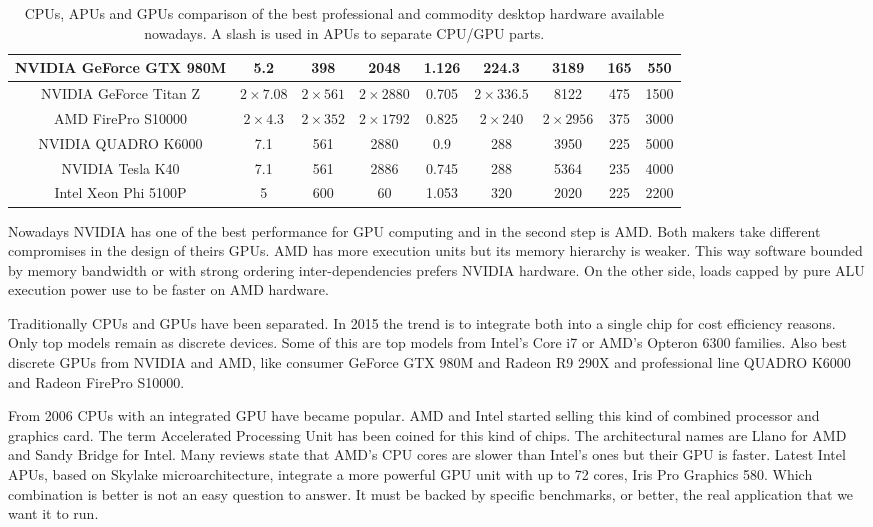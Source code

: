 \documentclass[review]{elsarticle}
\begin{document}
\begin{table*}[!h]
{\begin{tabular}{|c|c|c|c|c|c|c|c|c|}
\hline
NVIDIA GeForce GTX 980M & 5.2           & 398          & 2048          & 1.126      & 224.3        & 3189           & 165 & 550    \\
\hline
NVIDIA GeForce Titan Z  & $2\times7.08$ & $2\times561$ & $2\times2880$ & 0.705      & $2\times336.5$ & 8122         & 475 & 1500   \\
\hline
\hline
AMD FirePro S10000      & $2\times4.3$  & $2\times352$ & $2\times1792$ & 0.825      & $2\times240$ & $2\times2956$  & 375 & 3000   \\
\hline
NVIDIA QUADRO K6000     & 7.1           & 561          & 2880          & 0.9        & 288          & 3950           & 225 & 5000   \\
\hline
\hline
NVIDIA Tesla K40        & 7.1           & 561          & 2886          & 0.745      & 288          & 5364           & 235 & 4000   \\
\hline
Intel Xeon Phi 5100P    & 5             & 600          & 60            & 1.053      & 320          & 2020           & 225 & 2200   \\
\hline

\end{tabular}
}
\caption{CPUs, APUs and GPUs comparison of the best professional and commodity desktop hardware available nowadays. A slash is used in APUs to separate CPU/GPU parts. \label{tab:features}}
\end{table*}

Nowadays NVIDIA has one of the best performance for GPU computing \cite{benchmarkGPU2015} and in the second step is AMD. Both makers take different compromises in the design of theirs GPUs. AMD has more execution units but its memory hierarchy is weaker. This way software bounded by memory bandwidth or with strong ordering inter-dependencies prefers NVIDIA hardware. On the other side, loads capped by pure ALU execution power use to be faster on AMD hardware.

Traditionally CPUs and GPUs have been separated. In 2015 the trend is
to integrate both into a single chip for cost efficiency reasons. Only
top models remain as discrete devices. Some of this are top models
from Intel's Core i7 or AMD's Opteron 6300 families. Also best
discrete GPUs from NVIDIA and AMD, like consumer GeForce GTX 980M and
Radeon R9 290X and professional line QUADRO K6000 and Radeon FirePro
S10000.

From 2006 CPUs with an integrated GPU have became popular. AMD and Intel started selling this kind of combined processor and graphics card. The term Accelerated Processing Unit has been coined for this kind of chips. The architectural names are Llano for AMD and Sandy Bridge for Intel. Many reviews state that AMD's CPU cores are slower than Intel's ones but their GPU is faster. Latest Intel APUs, based on Skylake microarchitecture, integrate a more powerful GPU unit with up to 72 cores, Iris Pro Graphics 580. Which combination is better is not an easy question to answer. It must be backed by specific benchmarks, or better, the real application that we want it to run.
\end{document}
